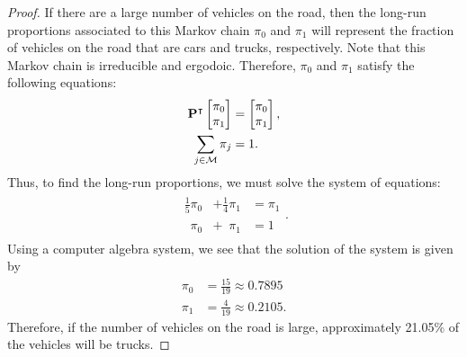 \begin{proof}
  If there are a large number of vehicles on the road, then the long-run proportions
  associated to this Markov chain $\pi_0$ and $\pi_1$ will represent the fraction of vehicles
  on the road that are cars and trucks, respectively.
  Note that this Markov chain is irreducible and ergodoic. Therefore, $\pi_0$ and $\pi_1$
  satisfy the following equations:
  \begin{align*}
     \bold{P}^\intercal \begin{bmatrix} \pi_0 \\ \pi_1 \\ \end{bmatrix} &= \begin{bmatrix} \pi_0 \\ \pi_1 \\ \end{bmatrix},\\
     \sum_{j\in \mathcal{M}} \pi_j &= 1.
  \end{align*}
  Thus, to find the long-run proportions, we must solve the system of equations:
  \begin{align*}
    \begin{array}{lll}
      \frac{1}{5}\pi_0 &+ \frac{1}{4}\pi_1 &= \pi_1 \\
      \phantom{\frac{1}{5}}\pi_0 &+ \phantom{\frac{1}{4}}\pi_1 &= 1
    \end{array}.
  \end{align*}
  Using a computer algebra system, we see that the solution of the system is given
  by
  \begin{align*}
    \pi_0 &= \frac{15}{19} \approx 0.7895\\
    \pi_1 &= \frac{4}{19} \approx 0.2105.
  \end{align*}
  Therefore, if the number of vehicles on the road is large,
  approximately 21.05\% of the vehicles will be trucks.
\end{proof}
\newpage
